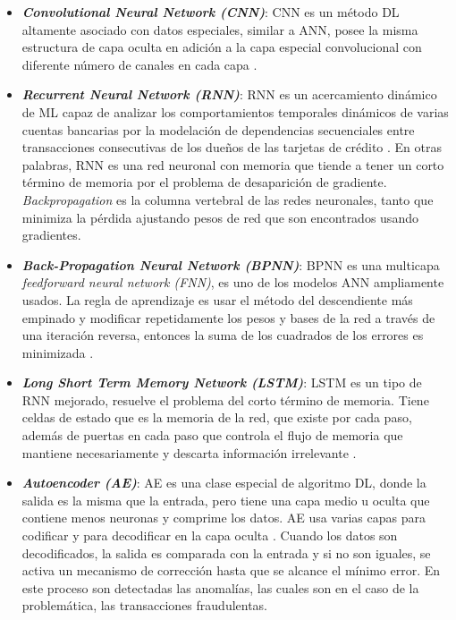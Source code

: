  \begin{itemize}
  	\item \textit{\textbf{Convolutional Neural Network (CNN)}}: CNN es un m\'{e}todo DL altamente asociado con datos especiales, similar a ANN, posee la misma estructura de capa oculta en adici\'{o}n a la capa especial convolucional con diferente n\'{u}mero de canales en cada capa \cite{16}.
  	\item \textit{\textbf{Recurrent Neural Network (RNN)}}: RNN es un acercamiento din\'{a}mico de ML capaz de analizar los comportamientos temporales din\'{a}micos de varias cuentas bancarias por la modelaci\'{o}n de dependencias secuenciales entre transacciones consecutivas de los due\~{n}os de las tarjetas de cr\'{e}dito \cite{17}. En otras palabras, RNN es una red neuronal con memoria que tiende a tener un corto t\'{e}rmino de memoria por el problema de desaparici\'{o}n de gradiente. \textit{Backpropagation} es la columna vertebral de las redes neuronales, tanto que minimiza la p\'{e}rdida ajustando pesos de red que son encontrados usando gradientes.
  	\item \textit{\textbf{Back-Propagation Neural Network (BPNN)}}: BPNN es una multicapa \textit{feedforward neural network (FNN)}, es uno de los modelos ANN ampliamente usados. La regla de aprendizaje es usar el m\'{e}todo del descendiente m\'{a}s empinado y modificar repetidamente los pesos y bases de la red a trav\'{e}s de una iteraci\'{o}n reversa, entonces la suma de los cuadrados de los errores es minimizada \cite{18}.
  	\item \textit{\textbf{Long Short Term Memory Network (LSTM)}}: LSTM es un tipo de RNN mejorado, resuelve el problema del corto t\'{e}rmino de memoria. Tiene celdas de estado que es la memoria de la red, que existe por cada paso, adem\'{a}s de puertas en cada paso que controla el flujo de memoria que mantiene necesariamente y descarta informaci\'{o}n irrelevante \cite{16}.
  	\item \textit{\textbf{Autoencoder (AE)}}: AE es una clase especial de algoritmo DL, donde la salida es la misma que la entrada, pero tiene una capa medio u oculta que contiene menos neuronas y comprime los datos. AE usa varias capas para codificar y para decodificar en la capa oculta \cite{5}. Cuando los datos son decodificados, la salida es comparada con la entrada y si no son iguales, se activa un mecanismo de correcci\'{o}n hasta que se alcance el m\'{i}nimo error. En este proceso son detectadas las anomal\'{i}as, las cuales son en el caso de la problem\'{a}tica, las transacciones fraudulentas.

\end{itemize}
